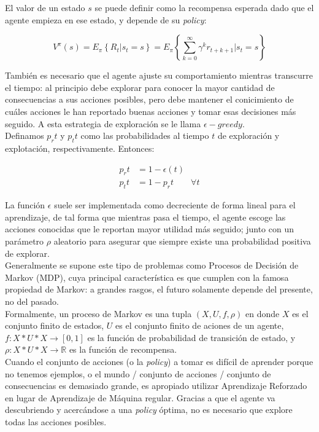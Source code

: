 El valor de un estado $s$ se puede definir como la recompensa esperada dado que el agente empieza en ese estado, y depende de su \textit{policy}:

$$
V^{\pi}(s) = E_{\pi}\left\{R_{t}|s_{t} = s\right\} = E_{\pi}\left\{\sum_{k=0}^{\infty}\gamma^{k}r_{t+k+1}|s_{t}=s\right\}
$$

Tambi\'en es necesario que el agente ajuste su comportamiento mientras transcurre el tiempo: al principio debe explorar para conocer la mayor cantidad de consecuencias a sus acciones posibles, pero debe mantener el conicimiento de cu\'ales acciones le han reportado buenas acciones y tomar esas decisiones m\'as seguido. A esta estrategia de exploraci\'on se le llama $\epsilon-greedy$.\\

Definamos $p_r{t}$ y $p_t{t}$ como las probabilidades al tiempo $t$ de exploraci\'on y explotaci\'on, respectivamente. Entonces:

\vspace{-30pt}
\begin{align*}
p_r{t} &= 1 - \epsilon(t) \\
p_t{t} &= 1 - p_r{t} \quad \quad \forall t
\end{align*}

La funci\'on $\epsilon$ suele ser implementada como decreciente de forma lineal para el aprendizaje,  de tal forma que mientras pasa el tiempo, el agente escoge las acciones conocidas que le reportan mayor utilidad m\'as seguido; junto con un par\'ametro $\rho$ aleatorio para asegurar que siempre existe una probabilidad positiva de explorar.\\

Generalmente se supone este tipo de problemas como Procesos de Decisi\'on de Markov (MDP), cuya principal caracter\'istica es que cumplen con la famosa propiedad de Markov: a grandes rasgos, el futuro solamente depende del presente, no del pasado.\\

Formalmente, un proceso de Markov es una tupla $(X,U,f,\rho)$ en donde $X$ es el conjunto finito de estados, $U$ es el conjunto finito de aciones de un agente, $f:X*U*X\rightarrow[0,1]$ es la funci\'on de probabilidad de transici\'on de estado, y $\rho:X*U*X\rightarrow\mathbb{R}$ es la funci\'on de recompensa. \\

Cuando el conjunto de acciones (o la \textit{policy}) a tomar es dif\'icil de aprender porque no tenemos ejemplos, o el mundo / conjunto de acciones / conjunto de consecuencias es demasiado grande, es apropiado utilizar Aprendizaje Reforzado en lugar de Aprendizaje de M\'aquina regular. Gracias a que el agente va descubriendo y acerc\'andose a una \textit{policy} \'optima, no es necesario que explore todas las acciones posibles. \\

